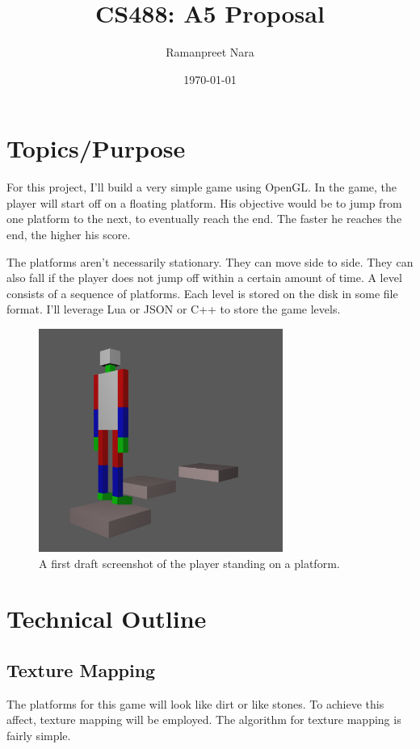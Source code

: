 \documentclass[11pt]{article}
\title{CS488: A5 Proposal}
\date{\today}
\author{Ramanpreet Nara}
\begin{document}
\maketitle
\newpage
\section*{Topics/Purpose}
For this project, I'll build a very simple game using OpenGL. In the game, the player will start off on a floating platform. His objective would be to jump from one platform to the next, to eventually reach the end. The faster he reaches the end, the higher his score.

The platforms aren't necessarily stationary. They can move side to side. They can also fall if the player does not jump off within a certain amount of time. A level consists of a sequence of platforms. Each level is stored on the disk in some file format. I'll leverage Lua or JSON or C++ to store the game levels. 

\begin{figure}[H]
\includegraphics[width=8cm]{screenshot}
\centering
\caption{A first draft screenshot of the player standing on a platform.}
\end{figure}
\section*{Technical Outline}
\subsection*{Texture Mapping}
The platforms for this game will look like dirt or like stones. To achieve this affect, texture mapping will be employed. The algorithm for texture mapping is fairly simple.
\end{document}
